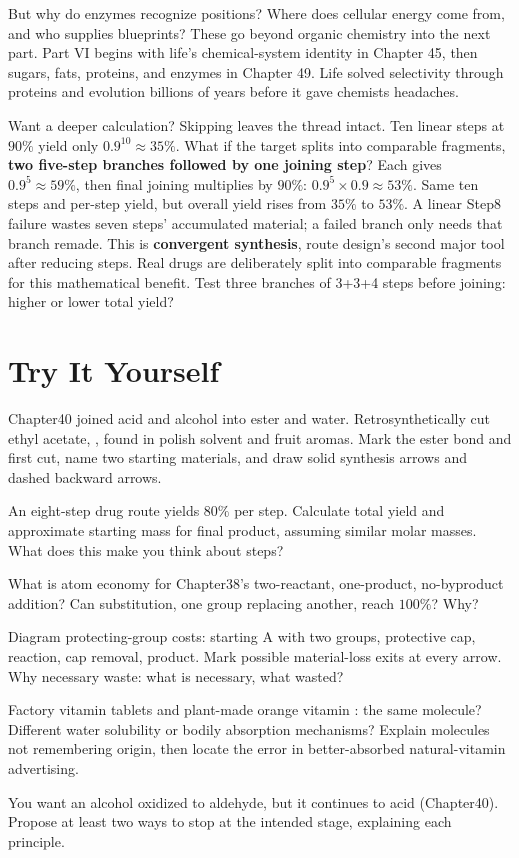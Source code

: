But why do enzymes recognize positions? Where does cellular energy come from, and who supplies blueprints? These go beyond organic chemistry into the next part. Part VI begins with life's chemical-system identity in Chapter 45, then sugars, fats, proteins, and enzymes in Chapter 49. Life solved selectivity through proteins and evolution billions of years before it gave chemists headaches.

\begin{tiaozhan}
Want a deeper calculation? Skipping leaves the thread intact. Ten linear steps at $90\%$ yield only $0.9^{10}\approx 35\%$. What if the target splits into comparable fragments, \textbf{two five-step branches followed by one joining step}? Each gives $0.9^5\approx 59\%$, then final joining multiplies by $90\%$: $0.9^5\times 0.9\approx 53\%$. Same ten steps and per-step yield, but overall yield rises from $35\%$ to $53\%$. A linear Step8 failure wastes seven steps' accumulated material; a failed branch only needs that branch remade. This is \textbf{convergent synthesis}, route design's second major tool after reducing steps. Real drugs are deliberately split into comparable fragments for this mathematical benefit. Test three branches of 3+3+4 steps before joining: higher or lower total yield?
\end{tiaozhan}

\section*{Try It Yourself}

\begin{sikaoti}
\item Chapter40 joined acid and alcohol into ester and water. Retrosynthetically cut ethyl acetate, , found in polish solvent and fruit aromas. Mark the ester bond and first cut, name two starting materials, and draw solid synthesis arrows and dashed backward arrows.
\item An eight-step drug route yields $80\%$ per step. Calculate total yield and approximate starting mass for  final product, assuming similar molar masses. What does this make you think about steps?
\item What is atom economy for Chapter38's two-reactant, one-product, no-byproduct addition? Can substitution, one group replacing another, reach $100\%$? Why?
\item Diagram protecting-group costs: starting A with two groups, protective cap, reaction, cap removal, product. Mark possible material-loss exits at every arrow. Why necessary waste: what is necessary, what wasted?
\item Factory vitamin  tablets and plant-made orange vitamin : the same molecule? Different water solubility or bodily absorption mechanisms? Explain molecules not remembering origin, then locate the error in better-absorbed natural-vitamin advertising.
\item You want an alcohol oxidized to aldehyde, but it continues to acid (Chapter40). Propose at least two ways to stop at the intended stage, explaining each principle.
\end{sikaoti}
